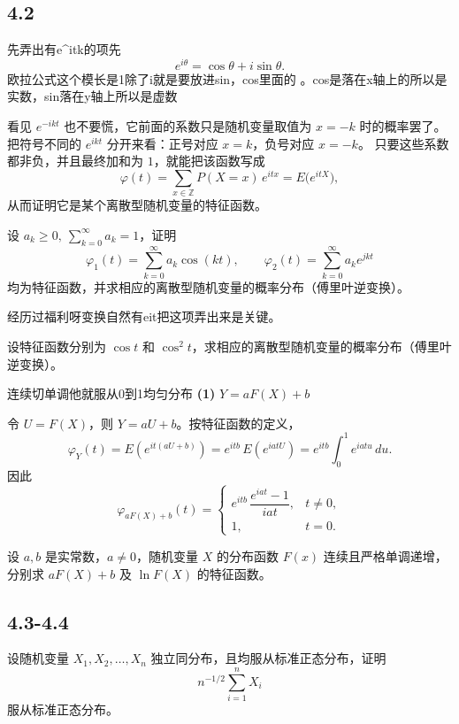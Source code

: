 \subsection*{4.2}
\begin{dxtips}
    先弄出有e^itk的项先\[
e^{i\theta}=\cos\theta+i\sin\theta.
\]
欧拉公式这个模长是1除了i就是要放进sin，cos里面的
。cos是落在x轴上的所以是实数，sin落在y轴上所以是虚数
\end{dxtips}
\begin{dxtips}
   看见 $e^{-ikt}$ 也不要慌，它前面的系数只是随机变量取值为 $x=-k$ 时的概率罢了。
把符号不同的 $e^{ikt}$ 分开来看：正号对应 $x=k$，负号对应 $x=-k$。
只要这些系数都非负，并且最终加和为 $1$，就能把该函数写成
\[
\varphi(t)=\sum_{x\in\mathbb Z} P(X=x)\,e^{itx}=E\!\big(e^{itX}\big),
\]
从而证明它是某个离散型随机变量的特征函数。
\end{dxtips}
\begin{homework}[4.5]
设 $a_k\ge 0,\ \sum_{k=0}^\infty a_k=1$，证明
\[
\varphi_1(t)=\sum_{k=0}^\infty a_k \cos(kt), 
\qquad 
\varphi_2(t)=\sum_{k=0}^\infty a_k e^{jkt}
\]
均为特征函数，并求相应的离散型随机变量的概率分布（傅里叶逆变换）。
\end{homework}
\begin{dxtips}
    经历过福利呀变换自然有eit把这项弄出来是关键。
\end{dxtips}
\begin{homework}[4.6]
设特征函数分别为 $\cos t$ 和 $\cos^2 t$，求相应的离散型随机变量的概率分布（傅里叶逆变换）。
\end{homework}
\begin{dxtips}
连续切单调他就服从0到1均匀分布
\textbf{(1) } $Y=aF(X)+b$

令 $U=F(X)$，则 $Y=aU+b$。按特征函数的定义，
\[
\varphi_Y(t)=E\!\left(e^{it(aU+b)}\right)
=e^{itb}\,E\!\left(e^{iatU}\right)
=e^{itb}\int_{0}^{1}e^{iatu}\,du.
\]
因此
\[
\varphi_{aF(X)+b}(t)=
\begin{cases}
e^{itb}\,\dfrac{e^{iat}-1}{iat}, & t\neq 0,\\[1ex]
1, & t=0.
\end{cases}
\]
\end{dxtips}
\begin{homework}[4.7]
设 $a,b$ 是实常数，$a\neq 0$，随机变量 $X$ 的分布函数 $F(x)$ 连续且严格单调递增，分别求 $aF(X)+b$ 及 $\ln F(X)$ 的特征函数。
\end{homework}
\subsection*{4.3-4.4}
\begin{homework}[4.11]
设随机变量 $X_1,X_2,\ldots,X_n$ 独立同分布，且均服从标准正态分布，证明  
\[
n^{-1/2}\sum_{i=1}^n X_i
\]
服从标准正态分布。
\end{homework}


